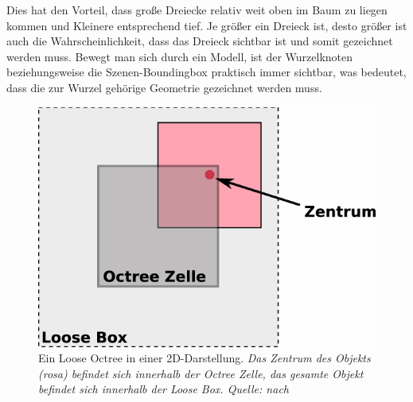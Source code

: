 Dies hat den Vorteil, dass große Dreiecke relativ weit oben im Baum zu liegen kommen und Kleinere entsprechend tief. Je größer ein Dreieck ist, desto größer ist auch die Wahrscheinlichkeit, dass das Dreieck sichtbar ist und somit gezeichnet werden muss. Bewegt man sich durch ein Modell, ist der Wurzelknoten beziehungsweise die Szenen-Boundingbox praktisch immer sichtbar, was bedeutet, dass die zur Wurzel gehörige Geometrie gezeichnet werden muss.
\begin{figure}
 \centering
  \includegraphics[scale=0.8]{images/looseoctree2.pdf}
  \caption{Ein Loose Octree in einer 2D-Darstellung. \textit{Das Zentrum des Objekts (rosa) befindet sich innerhalb der Octree Zelle, das gesamte Objekt befindet sich innerhalb der Loose Box. Quelle: nach \cite{anteru}}}
 \label{fig:basics:looseoctree}
\end{figure}

